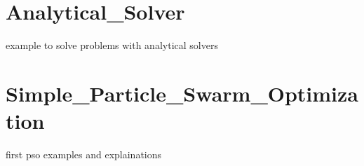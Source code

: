 \documentclass[
  oneside]{book}
\begin{document}
\hypertarget{analytical_solver}{%
\chapter{Analytical\_Solver}\label{analytical_solver}}

example to solve problems with analytical solvers

\hypertarget{simple_particle_swarm_optimization}{%
\chapter{Simple\_Particle\_Swarm\_Optimization}\label{simple_particle_swarm_optimization}}

first pso examples and explainations

  
\end{document}
